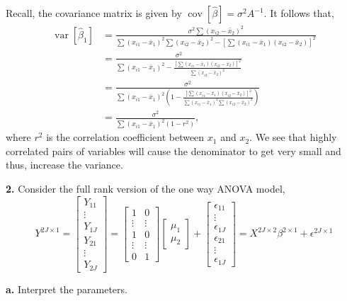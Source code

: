 \documentclass{article}
\newcommand{\Var}{\operatorname{Var}} %
\newcommand{\var}{\operatorname{var}} %
\newcommand{\cov}{\operatorname{cov}}
\begin{document}
Recall, the covariance matrix is given by \(\cov[ \hat \beta] =\sigma^2 A^{-1} \). It follows that, 
\begin{align*}
\var[\hat \beta_1 ]  &= \frac{\sigma^2 \sum(x_{i2}-\bar x_2)^2 }{ \sum(x_{i1}-\bar x_1)^2\sum(x_{i2}-\bar x_2)^2 - [ \sum (x_{i1} -\bar x_1)( x_{i2} -\bar x_2)]^2} \\
&= \frac{\sigma^2 }{ \sum(x_{i1}-\bar x_1)^2- \frac{[ \sum (x_{i1} -\bar x_1)( x_{i2} -\bar x_2)]^2}{\sum(x_{i2}-\bar x_2)^2 }}\\
&=  \frac{\sigma^2 }{ \sum(x_{i1}-\bar x_1)^2\left(1 - \frac{[ \sum (x_{i1} -\bar x_1)( x_{i2} -\bar x_2)]^2}{\sum(x_{i1}-\bar x_1)^2\sum(x_{i2}-\bar x_2)^2 }\right)}\\
&=  \frac{\sigma^2 }{ \sum(x_{i1}-\bar x_1)^2(1 - r^2)},
\end{align*}
where \(r^2\) is the correlation coefficient between \(x_1\) and \(x_2\). We see that highly correlated pairs of variables will cause the denominator to get very small and thus, increase the variance. 


\newpage
\textbf{2.} Consider the full rank version of the one way ANOVA model, 
\[
Y^{2J\times1} =\begin{bmatrix}
Y_{11}\\
\vdots\\
Y_{1J} \\
Y_{21}\\
\vdots\\
Y_{2J} 
\end{bmatrix}
=
\begin{bmatrix}
1&0\\
\vdots & \vdots\\
1 & 0 \\
\vdots & \vdots\\
0 & 1
\end{bmatrix}
\begin{bmatrix}
\mu_1 \\
\mu_2
\end{bmatrix}
+\begin{bmatrix}
\epsilon_{11}\\
\vdots\\
\epsilon_{1J}\\
\epsilon_{21}\\
\vdots\\
\epsilon_{1J} 
\end{bmatrix}
= X^{2J\times 2}\beta^{2\times1} + \epsilon^{2J\times1}
\]

\textbf{a.} Interpret the parameters. 
\end{document}
